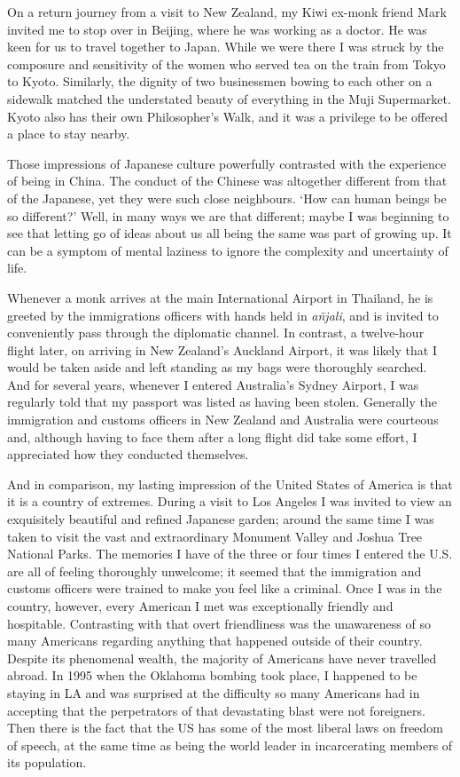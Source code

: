 On a return journey from a visit to New Zealand, my Kiwi ex-monk friend
Mark invited me to stop over in Beijing, where he was working as a
doctor. He was keen for us to travel together to Japan. While we were
there I was struck by the composure and sensitivity of the women who
served tea on the train from Tokyo to Kyoto. Similarly, the dignity of
two businessmen bowing to each other on a sidewalk matched the
understated beauty of everything in the Muji Supermarket. Kyoto also has
their own Philosopher's Walk\cite{walk}, and it was a privilege to be
offered a place to stay nearby.

Those impressions of Japanese culture powerfully contrasted with the
experience of being in China. The conduct of the Chinese was altogether
different from that of the Japanese, yet they were such close
neighbours. `How can human beings be so different?' Well, in many ways
we are that different; maybe I was beginning to see that letting go of
ideas about us all being the same was part of growing up. It can be a
symptom of mental laziness to ignore the complexity and uncertainty of
life.

Whenever a monk arrives at the main International Airport in Thailand,
he is greeted by the immigrations officers with hands held in
\emph{añjali}, and is invited to conveniently pass through the
diplomatic channel. In contrast, a twelve-hour flight later, on arriving
in New Zealand's Auckland Airport, it was likely that I would be taken
aside and left standing as my bags were thoroughly searched. And for
several years, whenever I entered Australia's Sydney Airport, I was
regularly told that my passport was listed as having been stolen.
Generally the immigration and customs officers in New Zealand and
Australia were courteous and, although having to face them after a long
flight did take some effort, I appreciated how they conducted
themselves.

And in comparison, my lasting impression of the United States of America
is that it is a country of extremes. During a visit to Los Angeles I was
invited to view an exquisitely beautiful and refined Japanese garden;
around the same time I was taken to visit the vast and extraordinary
Monument Valley\cite{monument} and Joshua Tree\cite{joshua}
National Parks. The memories I have of the three or
four times I entered the U.S. are all of feeling thoroughly unwelcome;
it seemed that the immigration and customs officers were trained to make
you feel like a criminal. Once I was in the country, however, every
American I met was exceptionally friendly and hospitable. Contrasting
with that overt friendliness was the unawareness of so many Americans
regarding anything that happened outside of their country. Despite its
phenomenal wealth, the majority of Americans have never travelled
abroad. In 1995 when the Oklahoma bombing\cite{oklahoma}
took place, I happened to be staying in LA and was
surprised at the difficulty so many Americans had in accepting that the
perpetrators of that devastating blast were not foreigners. Then there
is the fact that the US has some of the most liberal laws on freedom of
speech, at the same time as being the
world leader in incarcerating\cite{incarceration} members of its population.

